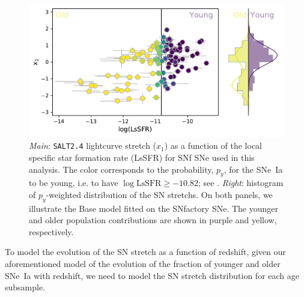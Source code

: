 \documentclass[]{aa} %
\begin{document}
\begin{figure}
    \centering
    \includegraphics[width=0.8\linewidth]{Article_figures/model_base_hist.pdf}
    \caption{\textit{Main}: \textsc{\texttt{SALT2.4}} lightcurve stretch ($x_1$)
        as a function of the local specific star formation rate (LsSFR) for SNf
        SNe used in this analysis. The color corresponds to the probability,
        $p_y$, for the SNe~Ia to be young, i.e. to have $\log\mathrm{LsSFR} \geq
        -10.82$; see \cite{rigault2018}. \textit{Right}: histogram of
        $p_y$-weighted distribution of the SN stretchs. On both panels, we
        illustrate the Base model fitted on the SNfactory SNe. The younger and
    older population contributions are shown in purple and yellow,
respectively.}
    \label{fig:stretchlssfr}
\end{figure}

To model the evolution of the SN stretch as a function of redshift, given our
aforementioned model of the evolution of the fraction of younger and older
SNe~Ia with redshift, we need to model the SN stretch distribution for each age
subsample. 
\end{document}
